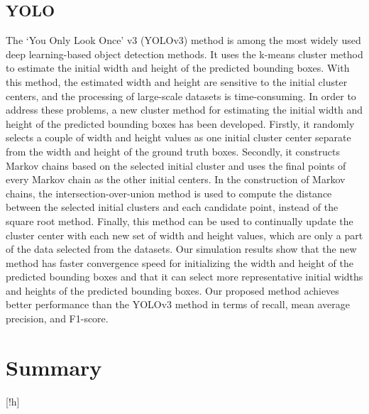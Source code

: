 \subsection{YOLO}
The ‘You Only Look Once’ v3 (YOLOv3) method is among the most widely used deep
learning-based object detection methods. It uses the k-means cluster method to estimate the initial
width and height of the predicted bounding boxes. With this method, the estimated width and height
are sensitive to the initial cluster centers, and the processing of large-scale datasets is time-consuming.
In order to address these problems, a new cluster method for estimating the initial width and height
of the predicted bounding boxes has been developed. Firstly, it randomly selects a couple of width
and height values as one initial cluster center separate from the width and height of the ground
truth boxes. Secondly, it constructs Markov chains based on the selected initial cluster and uses
the final points of every Markov chain as the other initial centers. In the construction of Markov
chains, the intersection-over-union method is used to compute the distance between the selected
initial clusters and each candidate point, instead of the square root method. Finally, this method
can be used to continually update the cluster center with each new set of width and height values,
which are only a part of the data selected from the datasets. Our simulation results show that the new
method has faster convergence speed for initializing the width and height of the predicted bounding
boxes and that it can select more representative initial widths and heights of the predicted bounding
boxes. Our proposed method achieves better performance than the YOLOv3 method in terms of
recall, mean average precision, and F1-score. \cite{art38}


\section{Summary}[!h]
